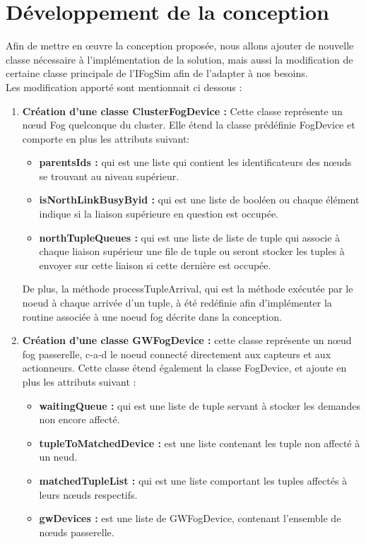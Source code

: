 \section{Développement de la conception}
Afin de mettre en œuvre la conception proposée, nous allons ajouter de nouvelle classe nécessaire à l’implémentation de la solution, mais aussi la modification de certaine classe principale de l’IFogSim afin de l’adapter à nos besoins.\\
Les modification apporté sont mentionnait ci dessous :
\begin{enumerate}
    \item \textbf{Création d’une classe ClusterFogDevice :} Cette classe représente un nœud Fog quelconque du cluster. Elle étend la classe prédéfinie FogDevice et comporte en plus les attributs suivant:
\begin{itemize}
    \item \textbf{parentsIds :} qui est une liste qui contient les identificateurs des nœuds se trouvant au niveau supérieur.
    \item \textbf{isNorthLinkBusyByid :} qui est une liste de booléen ou chaque élément indique si la liaison supérieure en question est occupée.
    \item \textbf{northTupleQueues :} qui est une liste de liste de tuple qui associe à chaque liaison supérieur une file de tuple ou seront stocker les tuples à envoyer sur cette liaison si cette dernière est occupée.
\end{itemize}
De plus, la méthode  processTupleArrival, qui est la méthode exécutée par le noeud à  chaque arrivée d’un tuple, à été redéfinie afin d’implémenter la routine associée à une noeud fog décrite dans la conception.
     \item \textbf{Création d’une classe GWFogDevice :} cette classe représente un nœud fog passerelle, c-a-d le noeud connecté directement aux capteurs et aux actionneurs. Cette classe étend également la classe FogDevice, et ajoute en plus les attributs suivant :
     \begin{itemize}
     \item \textbf{waitingQueue :} qui est une liste de tuple servant à stocker les demandes non encore affecté.
     \item \textbf{tupleToMatchedDevice :} est une liste contenant les tuple non affecté à un neud.
     \item \textbf{matchedTupleList :} qui est une liste comportant les tuples affectés à leurs nœuds respectifs.
     \item \textbf{gwDevices :} est une liste de GWFogDevice, contenant l'ensemble de nœuds passerelle.

\end{itemize}
\end{enumerate}
